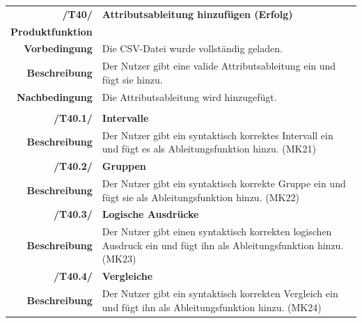 \documentclass{article}
\begin{document}
\begin{table}[H]
\begin{tabularx}{\textwidth}{rX}
 \vspace{1mm}
\textbf{/T40/}         & \textbf{Attributsableitung hinzufügen (Erfolg)} \\ \vspace{1mm}
\textbf{Produktfunktion} & \nameref{sec:f:Attributsableitung hinzufügen} \\ \vspace{1mm}
\textbf{Vorbedingung}  & Die CSV-Datei wurde vollständig geladen.   \\ \vspace{1mm}
\textbf{Beschreibung}  & Der Nutzer gibt eine valide Attributsableitung ein und fügt sie hinzu. \\
\textbf{Nachbedingung} & Die Attributsableitung wird hinzugefügt.\\
\\ \vspace{1mm} \textbf{/T40.1/}         & \textbf{Intervalle} \\
\textbf{Beschreibung}  & Der Nutzer gibt ein syntaktisch korrektes Intervall ein und fügt es als Ableitungsfunktion hinzu. (MK21) \\
\textbf{/T40.2/}         & \textbf{Gruppen} \\
\textbf{Beschreibung}  & Der Nutzer gibt ein syntaktisch korrekte Gruppe ein und fügt sie als Ableitungsfunktion hinzu. (MK22) \\
\textbf{/T40.3/}         & \textbf{Logische Ausdrücke} \\
\textbf{Beschreibung}  & Der Nutzer gibt einen syntaktisch korrekten logischen Ausdruck ein und fügt ihn als Ableitungsfunktion hinzu. (MK23) \\
\textbf{/T40.4/}         & \textbf{Vergleiche} \\
\textbf{Beschreibung}  & Der Nutzer gibt ein syntaktisch korrekten Vergleich ein und fügt ihn als Ableitungsfunktion hinzu. (MK24) \\
\end{tabularx}
\end{table}
\end{document}
